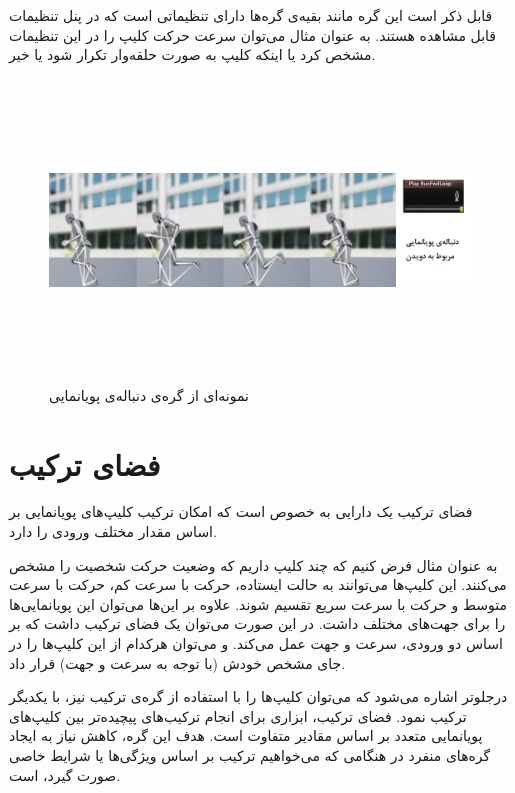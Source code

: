 قابل ذکر است این گره‌ مانند بقیه‌ی گره‌ها دارای تنظیماتی است که در پنل تنظیمات قابل مشاهده‌ هستند. به عنوان مثال 
می‌توان سرعت حرکت کلیپ را در این تنظیمات مشخص کرد یا اینکه کلیپ به صورت حلقه‌وار تکرار شود یا خیر.

\begin{figure}[ht]
	\centerline{\includegraphics[width=\textwidth,height=8cm,keepaspectratio]{Figures/Ch3/AnimationSequence.png}}

	\caption{نمونه‌ای از گره‌ی دنباله‌ی پویانمایی}
	\label{fig:AnimationSequence}
\end{figure}



\section {فضای ترکیب}

فضای ترکیب یک دارایی به خصوص است که 
امکان ترکیب کلیپ‌های پویانمایی بر اساس مقدار مختلف ورودی را دارد.

به عنوان مثال فرض کنیم که چند کلیپ داریم که 
وضعیت حرکت شخصیت را مشخص می‌کنند.
این کلیپ‌ها می‌توانند به 
حالت ایستاده، حرکت با سرعت کم، حرکت با سرعت متوسط 
و حرکت با سرعت سریع تقسیم شوند.
علاوه‌ بر این‌ها می‌توان این پویانمایی‌ها را برای جهت‌های مختلف داشت.
در این صورت می‌توان یک فضای ترکیب داشت که بر اساس 
دو ورودی، سرعت و جهت عمل می‌کند.
و می‌توان هرکدام از این کلیپ‌ها را در جای مشخص خودش 
(با توجه به سرعت و جهت)
قرار داد.

درجلوتر اشاره می‌شود که می‌توان کلیپ‌ها را با استفاده از 
گره‌ی ترکیب نیز، با یکدیگر ترکیب نمود. 
فضای ترکیب، ابزاری برای انجام ترکیب‌های پیچیده‌تر 
بین کلیپ‌های پویانمایی متعدد بر اساس 
مقادیر متفاوت است.
هدف این گره، کاهش نیاز به ایجاد گره‌های منفرد
در هنگامی که می‌خواهیم ترکیب بر اساس ویژگی‌ها یا شرایط خاصی 
صورت گیرد، است.



